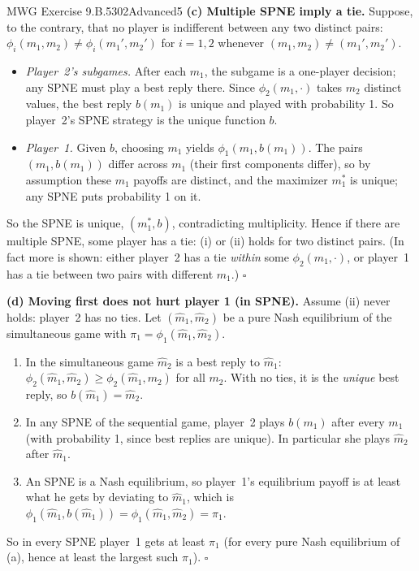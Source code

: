 \begin{exsol}{MWG Exercise 9.B.5}{302}{Advanced}{5}
\textbf{(c) Multiple SPNE imply a tie.} Suppose, to the contrary, that no player is indifferent between
any two distinct pairs: $\phi_i(m_1, m_2) \ne \phi_i(m_1', m_2')$ for $i = 1,2$ whenever
$(m_1,m_2) \ne (m_1',m_2')$.
\begin{itemize}
  \item \emph{Player~2's subgames.} After each $m_1$, the subgame is a one-player decision; any SPNE
  must play a best reply there. Since $\phi_2(m_1, \cdot)$ takes $m_2$ distinct values, the best reply
  $b(m_1)$ is unique and played with probability 1. So player~2's SPNE strategy is the unique
  function $b$.
  \item \emph{Player~1.} Given $b$, choosing $m_1$ yields $\phi_1(m_1, b(m_1))$. The pairs
  $(m_1, b(m_1))$ differ across $m_1$ (their first components differ), so by assumption these
  $m_1$ payoffs are distinct, and the maximizer $m_1^*$ is unique; any SPNE puts probability 1 on it.
\end{itemize}
So the SPNE is unique, $(m_1^*, b)$, contradicting multiplicity. Hence if there are multiple SPNE,
some player has a tie: (i) or (ii) holds for two distinct pairs. (In fact more is shown: either
player~2 has a tie \emph{within} some $\phi_2(m_1, \cdot)$, or player~1 has a tie between two pairs
with different $m_1$.) $\square$

\textbf{(d) Moving first does not hurt player 1 (in SPNE).} Assume (ii) never holds: player~2 has no
ties. Let $(\hat m_1, \hat m_2)$ be a pure Nash equilibrium of the simultaneous game with
$\pi_1 = \phi_1(\hat m_1, \hat m_2)$.
\begin{enumerate}[label=(\roman*)]
  \item In the simultaneous game $\hat m_2$ is a best reply to $\hat m_1$: $\phi_2(\hat m_1, \hat m_2)
  \ge \phi_2(\hat m_1, m_2)$ for all $m_2$. With no ties, it is the \emph{unique} best reply, so
  $b(\hat m_1) = \hat m_2$.
  \item In any SPNE of the sequential game, player~2 plays $b(m_1)$ after every $m_1$ (with
  probability 1, since best replies are unique). In particular she plays $\hat m_2$ after $\hat m_1$.
  \item An SPNE is a Nash equilibrium, so player~1's equilibrium payoff is at least what he gets by
  deviating to $\hat m_1$, which is $\phi_1(\hat m_1, b(\hat m_1)) = \phi_1(\hat m_1, \hat m_2) =
  \pi_1$.
\end{enumerate}
So in every SPNE player~1 gets at least $\pi_1$ (for every pure Nash equilibrium of (a), hence at least
the largest such $\pi_1$). $\square$


\end{exsol}
